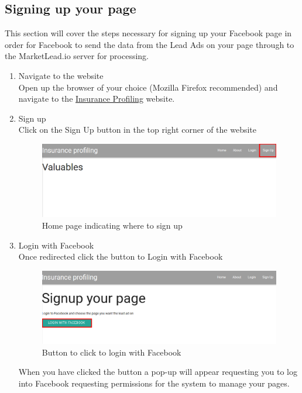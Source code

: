 \documentclass{article}
\begin{document}
		\subsection{Signing up your page}
			This section will cover the steps necessary for signing up your Facebook page in order for Facebook to send the data from the Lead Ads on your page through to the MarketLead.io server for processing.
			\begin{enumerate}
				\item Navigate to the website\\
				Open up the browser of your choice (Mozilla Firefox recommended) and navigate to the \href{https://insuranceprofiling.herokuapp.com}{Insurance Profiling} website.

				\item Sign up\\
				Click on the Sign Up button in the top right corner of the website\\
				\begin{figure}[H]
				  \centering
				      \includegraphics[width=\textwidth]{images/home_signup.png}
				  \caption{Home page indicating where to sign up}
				  \label{fig:homeSignup}
				\end{figure}

				\item Login with Facebook\\
				Once redirected click the button to Login with Facebook\\
				\begin{figure}[H]
				  \centering
				      \includegraphics[width=\textwidth]{images/signup_login.png}
				  \caption{Button to click to login with Facebook}
				  \label{fig:signupLogin}
				\end{figure}
				When you have clicked the button a pop-up will appear requesting you to log into Facebook requesting permissions for the system to manage your pages.


\end{enumerate}
\end{document}
